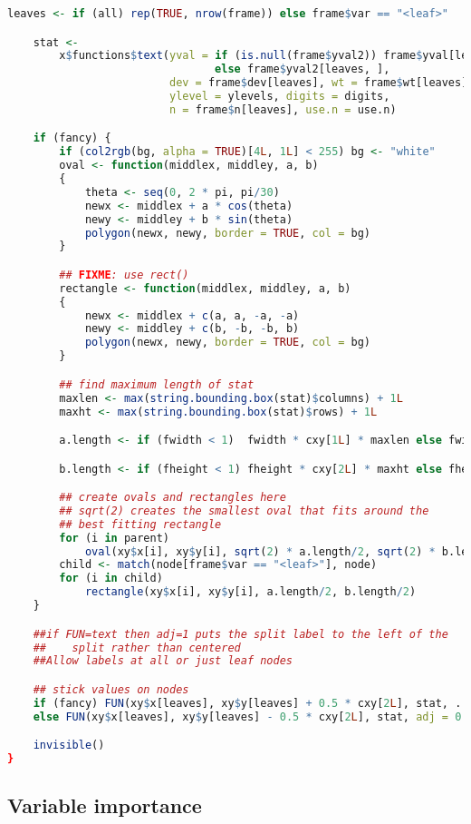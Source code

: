 \documentclass[10pt,a4paper]{article}
\begin{document}
\begin{lstlisting}[language=R]
    leaves <- if (all) rep(TRUE, nrow(frame)) else frame$var == "<leaf>"

    stat <-
        x$functions$text(yval = if (is.null(frame$yval2)) frame$yval[leaves]
                                else frame$yval2[leaves, ],
                         dev = frame$dev[leaves], wt = frame$wt[leaves],
                         ylevel = ylevels, digits = digits,
                         n = frame$n[leaves], use.n = use.n)

    if (fancy) {
        if (col2rgb(bg, alpha = TRUE)[4L, 1L] < 255) bg <- "white"
        oval <- function(middlex, middley, a, b)
        {
            theta <- seq(0, 2 * pi, pi/30)
            newx <- middlex + a * cos(theta)
            newy <- middley + b * sin(theta)
            polygon(newx, newy, border = TRUE, col = bg)
        }

        ## FIXME: use rect()
        rectangle <- function(middlex, middley, a, b)
        {
            newx <- middlex + c(a, a, -a, -a)
            newy <- middley + c(b, -b, -b, b)
            polygon(newx, newy, border = TRUE, col = bg)
        }

        ## find maximum length of stat
        maxlen <- max(string.bounding.box(stat)$columns) + 1L
        maxht <- max(string.bounding.box(stat)$rows) + 1L

        a.length <- if (fwidth < 1)  fwidth * cxy[1L] * maxlen else fwidth * cxy[1L]

        b.length <- if (fheight < 1) fheight * cxy[2L] * maxht else fheight * cxy[2L]

        ## create ovals and rectangles here
        ## sqrt(2) creates the smallest oval that fits around the
        ## best fitting rectangle
        for (i in parent)
            oval(xy$x[i], xy$y[i], sqrt(2) * a.length/2, sqrt(2) * b.length/2)
        child <- match(node[frame$var == "<leaf>"], node)
        for (i in child)
            rectangle(xy$x[i], xy$y[i], a.length/2, b.length/2)
    }

    ##if FUN=text then adj=1 puts the split label to the left of the
    ##    split rather than centered
    ##Allow labels at all or just leaf nodes

    ## stick values on nodes
    if (fancy) FUN(xy$x[leaves], xy$y[leaves] + 0.5 * cxy[2L], stat, ...)
    else FUN(xy$x[leaves], xy$y[leaves] - 0.5 * cxy[2L], stat, adj = 0.5, ...)

    invisible()
}
\end{lstlisting}
\subsection{Variable importance}
\bigskip
\end{document}
